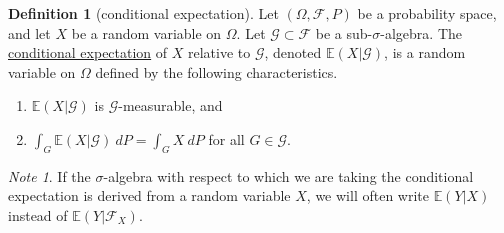 \documentclass[a4paper]{scrartcl}
\newcommand{\defn}[1]{\ul{#1}}
\theoremstyle{definition}
\newtheorem{definition}{Definition}[section]
\theoremstyle{plain}
\theoremstyle{remark}
\newtheorem{note}{Note}[section]
\begin{document}
\begin{definition}[conditional expectation]
  \label{def:conditionalexpectation}
  Let $(\Omega, \mathcal{F}, P)$ be a probability space, and let $X$ be a random variable on $\Omega$. Let $\mathcal{G} \subset \mathcal{F}$ be a sub-$\sigma$-algebra. The \defn{conditional expectation} of $X$ relative to $\mathcal{G}$, denoted $\mathbb{E}(X | \mathcal{G})$, is a random variable on $\Omega$ defined by the following characteristics.
  \begin{enumerate}
    \item $\mathbb{E}(X | \mathcal{G})$ is $\mathcal{G}$-measurable, and

    \item $\int_{G} \mathbb{E}(X | \mathcal{G})\ dP = \int_{G} X\ dP$ for all $G \in \mathcal{G}$.
  \end{enumerate}
\end{definition}

\begin{note}
  If the $\sigma$-algebra with respect to which we are taking the conditional expectation is derived from a random variable $X$, we will often write $\mathbb{E}(Y|X)$ instead of $\mathbb{E}(Y|\mathcal{F}_{X})$.
\end{note}
\end{document}
